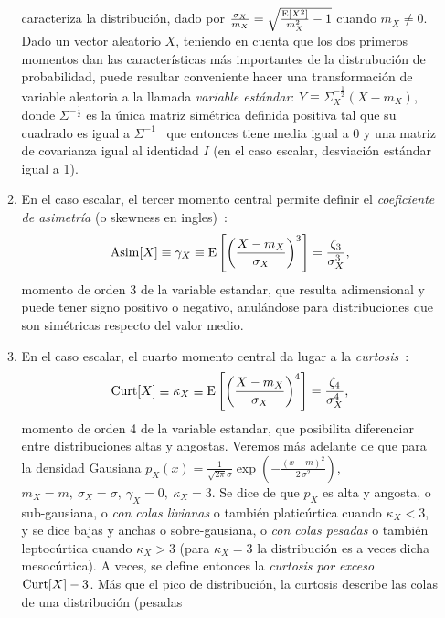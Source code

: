 \begin{itemize}
\begin{enumerate}
  caracteriza    la   distribuci\'on,    dado   por    $\frac{\sigma_X}{m_X}   =
  \sqrt{\frac{\operatorname{E}\left[  X^2 \right]}{m_X^2}-1}$ cuando  $m_X \ne  0$. \newline
  Dado un vector aleatorio $X$, teniendo en cuenta que los dos primeros momentos
  dan  las   caracter\'isticas  m\'as   importantes  de  la   distrubuci\'on  de
  probabilidad,  puede  resultar   conveniente  hacer  una  transformaci\'on  de
  variable  aleatoria  a  la   llamada  {\it  variable  est\'andar}:  $Y  \equiv
  \Sigma_X^{-\frac12} \left(  X - m_X \right)$, donde  $\Sigma^{-\frac12}$ es la
  \'unica matriz  sim\'etrica definida positiva tal  que su cuadrado  es igual a
  $\Sigma^{-1}$~\cite{HorJoh13, MagNeu99}  que entonces tiene media igual  a 0 y
  una  matriz  de  covarianza  igual  al  identidad $I$  (en  el  caso  escalar,
  desviaci\'on est\'andar igual a 1).
\item En  el caso  escalar, el  tercer momento central  permite definir  el {\it
    coeficiente de asimetr\'ia} (o skewness en ingles)~\cite{Pea05}:
  \[
  \operatorname{Asim}[X]  \equiv \gamma_X  \equiv \operatorname{E}\left[  \left( \frac{X  - m_X}{\sigma_X}
    \right)^3 \right] = \frac{\zeta_3}{\sigma_X^3},
  \]
  momento de orden  3 de la variable estandar, que  resulta adimensional y puede
  tener  signo positivo  o negativo,  anul\'andose para  distribuciones  que son
  sim\'etricas respecto del valor medio.
\item  En  el caso  escalar,  el  cuarto momento  central  da  lugar  a la  {\it
    curtosis}~\cite{Pea05, Wes14}:
  \[
  \operatorname{Curt}[X]  \equiv \kappa_X  \equiv \operatorname{E}\left[  \left( \frac{X  - m_X}{\sigma_X}
    \right)^4 \right] = \frac{\zeta_4}{\sigma_X^4},
  \]
  momento de orden  4 de la variable estandar,  que posibilita diferenciar entre
  distribuciones  altas y  angostas.   Veremos  m\'as adelante  de  que para  la
  densidad  Gausiana  $p_X(x)  =  \frac{1}{\sqrt{2  \pi}  \sigma}  \exp\left(  -
    \frac{(x-m)^2}{2 \, \sigma^2} \right)$, \ $m_X = m, \: \sigma_X = \sigma, \:
  \gamma_X =  0, \: \kappa_X  = 3$. Se  dice de que $p_X$  es alta y  angosta, o
  sub-gausiana,  o {\it con  colas livianas}  o tambi\'en  platic\'urtica cuando
  $\kappa_X < 3$,  y se dice bajas  y anchas o sobre-gausiana, o  {\it con colas
    pesadas} o tambi\'en leptoc\'urtica cuando  $\kappa_X > 3$ (para $\kappa_X =
  3$  la distribuci\'on es  a veces  dicha mesoc\'urtica).   A veces,  se define
  entonces la {\it curtosis por exceso} \  $\operatorname{Curt}[X] - 3$.  M\'as que el pico de
  distribuci\'on, la curtosis describe  las colas de una distribuci\'on (pesadas

\end{enumerate}
\end{itemize}
